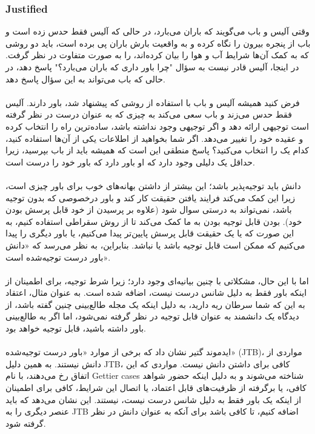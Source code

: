 \documentclass[10pt,a4paper]{article}
\begin{document}
                    \subsubsection{Justified} وقتی آلیس و باب می‌گویند که باران می‌بارد، در حالی که آلیس فقط حدس زده است و باب از پنجره بیرون را نگاه کرده و به واقعیت بارش باران پی برده است، باید دو روشی که به کمک آن‌ها شرایط آب و هوا را بیان کرده‌اند، را به صورت متفاوت در نظر گرفت. در اینجا، آلیس قادر نیست به سؤال "چرا باور داری که باران می‌بارد؟" پاسخ دهد، در حالی که باب می‌تواند به این سؤال پاسخ دهد.
                    \\
                    \\
                    فرض کنید همیشه آلیس و باب با استفاده از روشی که پیشنهاد شد، باور دارند. آلیس فقط حدس می‌زند و باب سعی می‌کند به چیزی که به عنوان درست در نظر گرفته است توجیهی ارائه دهد و اگر توجیهی وجود نداشته باشد، ساده‌ترین راه را انتخاب کرده و عقیده خود را تغییر می‌دهد. اگر شما بخواهید از اطلاعات یکی از آن‌ها استفاده کنید، کدام یک را انتخاب می‌کنید؟ پاسخ منطقی این است که همیشه باید از باب بپرسید، زیرا حداقل یک دلیلی وجود دارد که او باور دارد که باور خود را درست است.
                    \\
                    \\
                   دانش باید توجیه‌پذیر باشد؛ این بیشتر از داشتن بهانه‌های خوب برای باور چیزی است، زیرا این کمک می‌کند فرایند یافتن حقیقت کار کند و باور درخصوصی که بدون توجیه باشد، نمی‌تواند به درستی سوال شود (علاوه بر پرسیدن از خود قابل پرسش بودن خود). بودن قابل توجیه بودن به ما کمک می‌کند تا از روش سقراطی استفاده کنیم، به این صورت که یا یک حقیقت قابل پرسش پایین‌تر پیدا می‌کنیم، یا باور دیگری را پیدا می‌کنیم که ممکن است قابل توجیه باشد یا نباشد. بنابراین، به نظر می‌رسد که «دانش باور درست توجیه‌شده است».
                    \\
                    \\
                    اما با این حال، مشکلاتی با چنین بیانیه‌ای وجود دارد؛ زیرا شرط توجیه، برای اطمینان از اینکه باور فقط به دلیل شانس درست نیست، اضافه شده است. به عنوان مثال، اعتقاد به این که شما سرطان ریه دارید، به دلیل اینکه یک مجله طالع‌بینی چنین گفته باشد، از دیدگاه یک دانشمند به عنوان قابل توجیه در نظر گرفته نمی‌شود، اما اگر به طالع‌بینی باور داشته باشید، قابل توجیه خواهد بود.
                    \\
                    \\
                   ایدموند گتیر نشان داد که برخی از موارد «باور درست توجیه‌شده» (JTB)، مواردی از دانش نیستند. به همین دلیل JTB، کافی برای داشتن دانش نیست. مواردی که این اتفاق رخ می‌دهند، با نام Gettier cases شناخته می‌شوند و به دلیل اینکه حضور شواهد کافی، یا برگرفته از ظرفیت‌های قابل اعتماد، یا اتصال این شرایط، کافی برای اطمینان از اینکه یک باور فقط به دلیل شانس درست نیست، نیستند. این نشان می‌دهد که باید عنصر دیگری را به JTB اضافه کنیم، تا کافی باشد برای آنکه به عنوان دانش در نظر گرفته شود.\cite{sep-epistemology}
                    \\
                    \\
\end{document}
